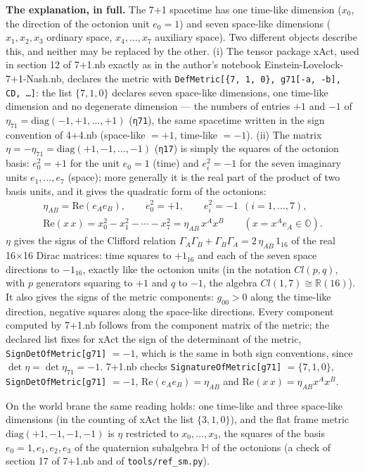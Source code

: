 \documentclass[10pt,a4paper]{article}
\begin{document}
\textbf{The explanation, in full.} The 7+1 spacetime has one time-like dimension ($x_0$, the direction of the octonion unit $e_0=1$) and seven space-like dimensions ($x_1,x_2,x_3$ ordinary space, $x_4,\dots,x_7$ auxiliary space). Two different objects describe this, and neither may be replaced by the other. (i) The tensor package xAct, used in section 12 of 7+1.nb exactly as in the author’s notebook Einstein-Lovelock-7+1-Nash.nb, declares the metric with \texttt{DefMetric[\{7, 1, 0\}, g71[-a, -b], CD, …]}: the list $\{7,1,0\}$ declares seven space-like dimensions, one time-like dimension and no degenerate dimension — the numbers of entries $+1$ and $-1$ of $\eta_{71}=\mathrm{diag}(-1,+1,\dots,+1)$ (\texttt{η71}), the same spacetime written in the sign convention of 4+4.nb (space-like $=+1$, time-like $=-1$). (ii) The matrix $\eta=-\eta_{71}=\mathrm{diag}(+1,-1,\dots,-1)$ (\texttt{η17}) is simply the squares of the octonion basis: $e_0^2=+1$ for the unit $e_0=1$ (time) and $e_i^2=-1$ for the seven imaginary units $e_1,\dots,e_7$ (space); more generally it is the real part of the product of two basis units, and it gives the quadratic form of the octonions:
\begin{gather*}
\eta_{AB}=\mathrm{Re}(e_Ae_B),\qquad e_0^2=+1,\qquad e_i^2=-1\ \ (i=1,\dots,7),\\ \mathrm{Re}(x\,x)=x_0^2-x_1^2-\cdots-x_7^2=\eta_{AB}\,x^Ax^B\qquad (x=x^Ae_A\in\mathbb O).
\end{gather*}
$\eta$ gives the signs of the Clifford relation $\Gamma_A\Gamma_B+\Gamma_B\Gamma_A=2\,\eta_{AB}\,1_{16}$ of the real 16×16 Dirac matrices: time squares to $+1_{16}$ and each of the seven space directions to $-1_{16}$, exactly like the octonion units (in the notation $Cl(p,q)$, with $p$ generators squaring to $+1$ and $q$ to $-1$, the algebra $Cl(1,7)\cong\mathbb R(16)$). It also gives the signs of the metric components: $g_{00}>0$ along the time-like direction, negative squares along the space-like directions. Every component computed by 7+1.nb follows from the component matrix of the metric; the declared list fixes for xAct the sign of the determinant of the metric, \texttt{SignDetOfMetric[g71]} $=-1$, which is the same in both sign conventions, since $\det \eta=\det \eta_{71}=-1$. 7+1.nb checks \texttt{SignatureOfMetric[g71]} $=\{7,1,0\}$, \texttt{SignDetOfMetric[g71]} $=-1$, $\mathrm{Re}(e_Ae_B)=\eta_{AB}$ and $\mathrm{Re}(x\,x)=\eta_{AB}x^Ax^B$.

On the world brane the same reading holds: one time-like and three space-like dimensions (in the counting of xAct the list $\{3,1,0\}$), and the flat frame metric $\mathrm{diag}(+1,-1,-1,-1)$ is $\eta$ restricted to $x_0,\dots,x_3$, the squares of the basis $e_0=1,e_1,e_2,e_3$ of the quaternion subalgebra $\mathbb H$ of the octonions (a check of section 17 of 7+1.nb and of \texttt{tools/\allowbreak{}ref\_\allowbreak{}sm.py}).
\end{document}
